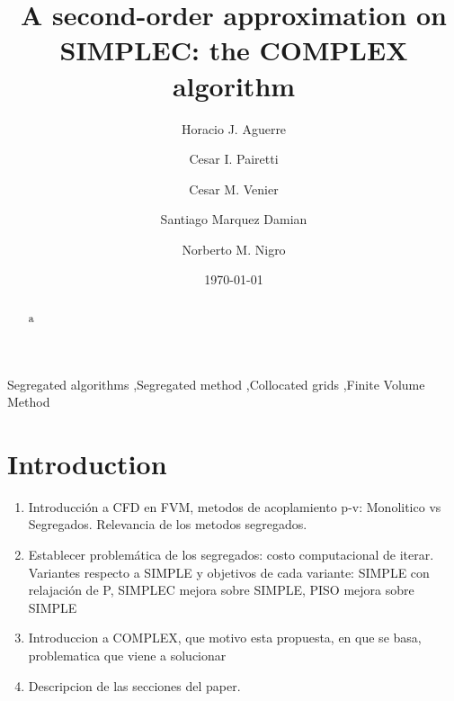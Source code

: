 \documentclass[final,3p,times,10pt,onecolumn]{myElsarticle}
\date{\today}
\numberwithin{equation}{section}
\begin{document}
\begin{frontmatter}

\title{A second-order approximation on SIMPLEC: the COMPLEX algorithm}
 
\author[a,e]{Horacio J. Aguerre}
\author[b,a]{Cesar I. Pairetti}
\author[a,b]{Cesar M. Venier}
\author[a,c]{Santiago Marquez Damian}
\author[a,d]{Norberto M. Nigro}

\address[a]{Centro de Investigación de Métodos Computacionales, CONICET-UNL, Santa Fe, Argentina}
\address[b]{Escuela de Ingenier\'ia Mec\'anica, Facultad de Ciencias Exactas, Ingenieria y Agrimensura, Universidad Nacional de Rosario, Rosario, Argentina}
\address[c]{Facultad Regional Santa Fe, Universidad Tecnologica Nacional, Santa Fe, Argentina}
\address[d]{Facultad de Ingeniería y Ciencias Hídricas, Universidad Nacional del Litoral, Santa Fe, Argentina}
\address[e]{Facultad Regional Concepción de Uruguay, Universidad Tecnologica Nacional, Concepción del Uruguay, Argentina}

\begin{abstract}
a
\end{abstract}

\begin{keyword}
Segregated algorithms \sep Segregated method \sep Collocated grids \sep Finite Volume Method 
\end{keyword}
\end{frontmatter}

\section{Introduction}

\begin{enumerate}
    \item {\color{red} Introducción a CFD en FVM, metodos de acoplamiento p-v: Monolitico vs Segregados. Relevancia de los metodos segregados.} 
    \item {\color{red} Establecer problemática de los segregados: costo computacional de iterar. Variantes respecto a SIMPLE y objetivos de cada variante: SIMPLE con relajación de P, SIMPLEC mejora sobre SIMPLE, PISO mejora sobre SIMPLE}
    \item {\color{red} Introduccion a COMPLEX, que motivo esta propuesta, en que se basa, problematica que viene a solucionar}
    \item {\color{red} Descripcion de las secciones del paper.}
\end{enumerate}
\end{document}
